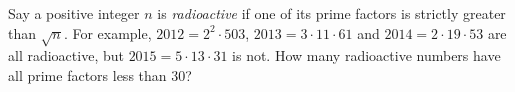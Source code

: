 Say a positive integer $n$ is \emph{radioactive} if one of its prime factors is strictly greater than $\sqrt{n}$. For example, $2012 = 2^2 \cdot 503$, $2013 = 3 \cdot 11 \cdot 61$ and $2014 = 2 \cdot 19 \cdot 53$ are all radioactive, but $2015 = 5 \cdot 13 \cdot 31$ is not. How many radioactive numbers have all prime factors less than $30$?
